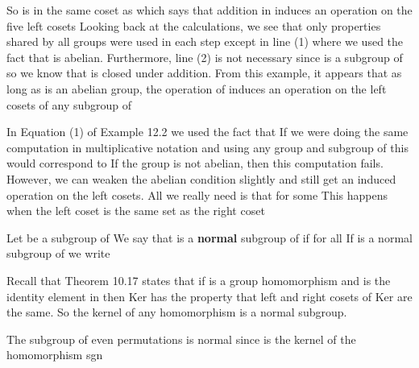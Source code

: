 \documentclass[11pt,oneside]{article}
\begin{document}
\begin{BookBody}
\noindent So  is in the same coset as  which says that addition in  induces an operation on the five left cosets  Looking back at the calculations, we see that only properties shared by all groups were used in each step except in line (1) where we used the fact that  is abelian. Furthermore, line (2) is not necessary since  is a subgroup of  so we know that  is closed under addition. From this example, it appears that as long as  is an abelian group, the operation of  induces an operation on the left cosets of any subgroup of \BookEnd{\blacktriangle}

\noindent In Equation (1) of Example 12.2 we used the fact that  If we were doing the same computation in multiplicative notation and using any group  and subgroup  of  this would correspond to  If the group  is not abelian, then this computation fails. However, we can weaken the abelian condition slightly and still get an induced operation on the left cosets. All we really need is that  for some  This happens when the left coset  is the same set as the right coset 

 Let  be a subgroup of  We say that  is a\textbf{ normal} subgroup of  if for all   If  is a normal subgroup of  we write \BookEnd{\blacksquare}

Recall that Theorem 10.17 states that if  is a group homomorphism and  is the identity element in  then Ker has the property that left and right cosets of Ker\BookInline{(\phi )} are the same. So the kernel of any homomorphism is a normal subgroup.

 The subgroup of even permutations  is normal since  is the kernel of the homomorphism sgn \BookEnd{\blacktriangle}

\end{BookBody}
\end{document}
